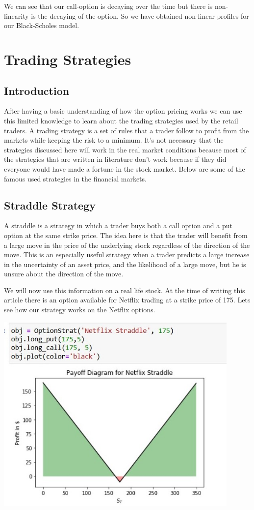 \documentclass[12pt]{article}
\begin{document}
We can see that our call-option is decaying over the time but there is non-linearity is the decaying of the option. So we have obtained non-linear profiles for our Black-Scholes model.

	\section{Trading Strategies}
	\subsection{Introduction}
	After having a basic understanding of how the option pricing works we can use this limited knowledge to learn about the trading strategies used by the retail traders.
	A trading strategy is a set of rules that a trader follow to profit from the markets while keeping the risk to a minimum. It's not necessary that the strategies discussed here will work in the real market conditions because most of the strategies that are written in literature don't work because if they did everyone would have made a fortune in the stock market. Below are some of the famous used strategies in the financial markets.
	
	\subsection{Straddle Strategy}
	A straddle is a strategy in which a trader buys both a call option and a put option at the same strike price. The idea here is that the trader will benefit from a large move in the price of the underlying stock regardless of the direction of the move. This is an especially useful strategy when a trader predicts a large increase in the uncertainty of an asset price, and the likelihood of a large move, but he is unsure about the direction of the move.
	
	We will now use this information on a real life stock. At the time of writing this article there is an option available for Netflix trading at a strike price of 175. Lets see how our strategy works on the Netflix options. \cite{bwordl3}
	
	\includegraphics[width=12cm]{straddle}
	
\end{document}
